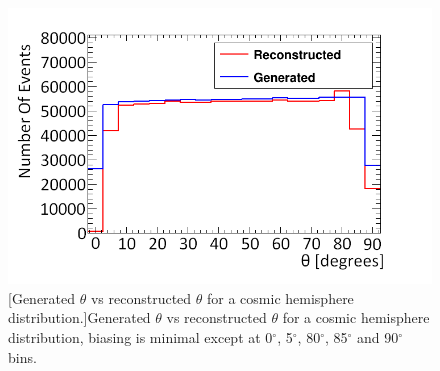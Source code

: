 \begin{figure}[!h]
 \centering
 \includegraphics[width=0.5\linewidth]{Chapter6/Figs/Raster/hemisphereThetaCompareMedText.png}
 [Generated $\theta$ vs reconstructed $\theta$ for a cosmic hemisphere distribution.]{Generated $\theta$ vs reconstructed $\theta$ for a cosmic hemisphere distribution, biasing is minimal except at 0$^\circ$, 5$^\circ$, 80$^\circ$, 85$^\circ$ and 90$^\circ$ bins.} 
 \label{fig:thetaGenVsRecoHem}
\end{figure}

